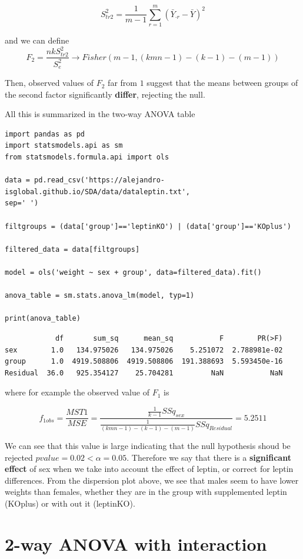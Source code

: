 \documentclass[
]{book}
\begin{document}
\[S^2_{tr2}=\frac{1}{m-1} \sum_{r=1}^m(\bar{Y}_{\cdot r}-\bar{Y})^2\]

and we can define \[F_2=\frac{nkS_{tr2}^2}{S_{e}^2}\rightarrow Fisher(m-1,(kmn-1)-(k-1)-(m-1))\]

Then, observed values of \(F_2\) far from \(1\) suggest that the means between groups of the second factor significantly \textbf{differ}, rejecting the null.

All this is summarized in the two-way ANOVA table

\begin{verbatim}
import pandas as pd
import statsmodels.api as sm
from statsmodels.formula.api import ols

data = pd.read_csv('https://alejandro-isglobal.github.io/SDA/data/dataleptin.txt', 
sep=' ')

filtgroups = (data['group']=='leptinKO') | (data['group']=='KOplus')

filtered_data = data[filtgroups]

model = ols('weight ~ sex + group', data=filtered_data).fit()

anova_table = sm.stats.anova_lm(model, typ=1)

print(anova_table)
\end{verbatim}

\begin{verbatim}
            df       sum_sq      mean_sq           F        PR(>F)
sex        1.0   134.975026   134.975026    5.251072  2.788981e-02
group      1.0  4919.508806  4919.508806  191.388693  5.593450e-16
Residual  36.0   925.354127    25.704281         NaN           NaN
\end{verbatim}

where for example the observed value of \(F_1\) is

\[f_{1obs}=\frac{MST1}{MSE}=\frac{\frac{1}{k-1}SSq_{sex}}{\frac{1}{(kmn-1)-(k-1)-(m-1)}SSq_{Residual}}=5.2511\]

We can see that this value is large indicating that the null hypothesis shoud be rejected \(pvalue=0.02<\alpha=0.05\). Therefore we say that there is a \textbf{significant effect} of sex when we take into account the effect of leptin, or correct for leptin differences. From the dispersion plot above, we see that males seem to have lower weights than females, whether they are in the group with supplemented leptin (KOplus) or with out it (leptinKO).

\hypertarget{way-anova-with-interaction}{%
\section{2-way ANOVA with interaction}\label{way-anova-with-interaction}}
\end{document}
